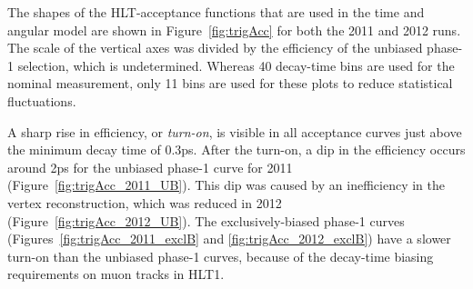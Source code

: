 The shapes of the HLT-acceptance functions that are used in the time and angular model are shown in Figure~\ref{fig:trigAcc} for both the
2011 and 2012 runs. The scale of the vertical axes was divided by the efficiency of the unbiased phase-1 selection, which is undetermined.
Whereas 40 decay-time bins are used for the nominal measurement, only 11 bins are used for these plots to reduce statistical fluctuations.

A sharp rise in efficiency, or \emph{turn-on}, is visible in all acceptance curves just above the minimum decay time of 0.3\unitsp{}ps.
After the turn-on, a dip in the efficiency occurs around 2\unitsp{}ps for the unbiased phase-1 curve for 2011
(Figure~\ref{fig:trigAcc_2011_UB}). This dip was caused by an inefficiency in the vertex reconstruction, which was reduced in 2012
(Figure~\ref{fig:trigAcc_2012_UB}). The exclusively-biased phase-1 curves (Figures~\ref{fig:trigAcc_2011_exclB} and
\ref{fig:trigAcc_2012_exclB}) have a slower turn-on than the unbiased phase-1 curves, because of the decay-time biasing requirements on
muon tracks in HLT1.
